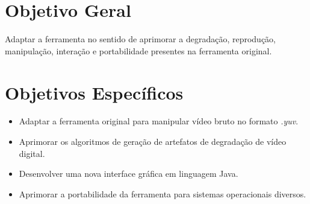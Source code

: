 \section{Objetivo Geral}
Adaptar a ferramenta  no sentido de aprimorar a degradação, reprodução, manipulação, interação e portabilidade  presentes na ferramenta original.
\section{Objetivos Específicos}
\begin{itemize}
	\item \textbf{} Adaptar a ferramenta original para manipular vídeo bruto no formato \emph{.yuv}.
	\item \textbf{} Aprimorar os algoritmos de geração de artefatos de degradação de vídeo digital.
	\item \textbf{} Desenvolver uma nova interface gráfica em linguagem Java.
	\item \textbf{} Aprimorar a portabilidade da ferramenta para sistemas operacionais diversos.
\end{itemize}
